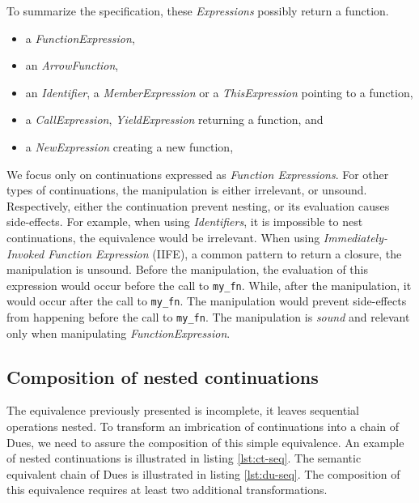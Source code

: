 To summarize the specification, these \textit{Expressions} possibly return a function.
\begin{itemize}
  \item a \textit{FunctionExpression},
  \item an \textit{ArrowFunction},
  \item an \textit{Identifier}, a \textit{MemberExpression} or a \textit{ThisExpression} pointing to a function,
  \item a \textit{CallExpression}, \textit{YieldExpression} returning a function, and
  \item a \textit{NewExpression} creating a new function,
\end{itemize}

We focus only on continuations expressed as \textit{Function Expressions}.
For other types of continuations, the manipulation is either irrelevant, or unsound.
Respectively, either the continuation prevent nesting, or its evaluation causes side-effects.
For example, when using \textit{Identifiers}, it is impossible to nest continuations, the equivalence would be irrelevant.
When using \textit{Immediately-Invoked Function Expression} (IIFE), a common pattern to return a closure, the manipulation is unsound.
Before the manipulation, the evaluation of this expression would occur before the call to \texttt{my_fn}.
While, after the manipulation, it would occur after the call to \texttt{my_fn}.
The manipulation would prevent side-effects from happening before the call to \texttt{my_fn}.
The manipulation is \textit{sound} and relevant only when manipulating \textit{FunctionExpression}.

\subsection{Composition of nested continuations} \label{section:equivalence:composition}

The equivalence previously presented is incomplete, it leaves sequential operations nested.
To transform an imbrication of continuations into a chain of Dues, we need to assure the composition of this simple equivalence.
An example of nested continuations is illustrated in listing \ref{lst:ct-seq}.
The semantic equivalent chain of Dues is illustrated in listing \ref{lst:du-seq}.
The composition of this equivalence requires at least two additional transformations.


